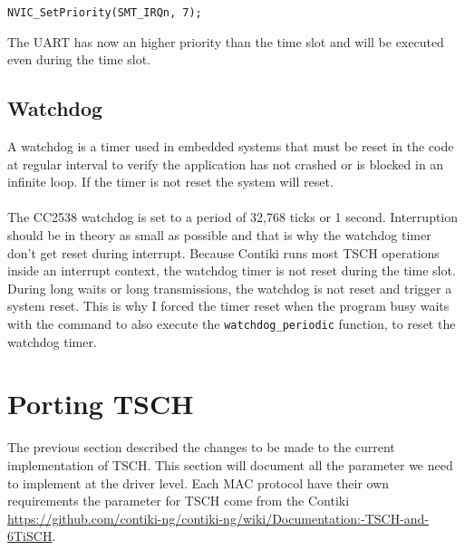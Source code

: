 \begin{lstlisting}
NVIC_SetPriority(SMT_IRQn, 7);
\end{lstlisting}

The UART has now an higher priority than the time slot and will be executed even
during the time slot.

\subsection{Watchdog}

A watchdog is a timer used in embedded systems that must be reset in the
code at regular interval to verify the application has not crashed or is blocked
in an infinite loop. If the timer is not reset the system will reset.

\paragraph{}

The CC2538 watchdog is set to a period of 32,768 ticks or 1 second.
Interruption should be in theory as small as possible and that is why the watchdog timer
don't get reset during interrupt.
Because Contiki runs most TSCH operations inside an interrupt
context, the watchdog timer is not reset during the time slot.
During long waits or long transmissions, the watchdog is not reset and trigger
a system reset.
This is why I forced the timer reset when the program busy waits with the command
to also execute the \lstinline{watchdog_periodic} function, to reset the
watchdog timer.

%
%

\section{Porting TSCH}

The previous section described the changes to be made to the current
implementation of TSCH.
This section will document all the parameter we need to implement at the driver
level.
Each MAC protocol have their own requirements the parameter for TSCH come from
the Contiki \href{wiki}{https://github.com/contiki-ng/contiki-ng/wiki/Documentation:-TSCH-and-6TiSCH}.

